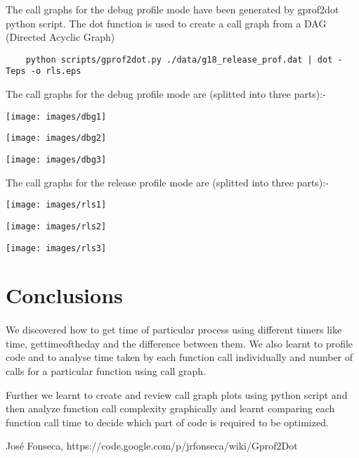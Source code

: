 \documentclass[11pt]{article}
\begin{document}
The call graphs for the debug profile mode have been generated by gprof2dot python 
script. The dot function is used to create a call graph from a DAG (Directed Acyclic Graph)

\begin{lstlisting}
	python scripts/gprof2dot.py ./data/g18_release_prof.dat | dot -Teps -o rls.eps
\end{lstlisting}

The call graphs for the debug profile mode are (splitted into three parts):-

\begin{center}
 \texttt{[image: images/dbg1]} \\
\end{center}

\begin{center}
 \texttt{[image: images/dbg2]} \\
\end{center}

\begin{center}
 \texttt{[image: images/dbg3]} \\
\end{center}

The call graphs for the release profile mode are (splitted into three parts):-
\begin{center}
 \texttt{[image: images/rls1]} \\
\end{center}

\begin{center}
 \texttt{[image: images/rls2]} \\
\end{center}

\begin{center}
 \texttt{[image: images/rls3]} \\
\end{center}


\section{Conclusions}
\paragraph{}
	We discovered how to get time of particular process using different timers like time, gettimeoftheday and the 
	difference between them. We also learnt to profile code and to analyse time taken by each function call individually 
	and number of calls for a particular function using call graph.

	Further we learnt to create and review call graph plots using python script and then analyze function call complexity graphically
 and learnt comparing each function call time to decide which part of code is required to be optimized.
	
\begin{thebibliography}{1}

 José Fonseca, https://code.google.com/p/jrfonseca/wiki/Gprof2Dot
 
\end{thebibliography}
\end{document}

